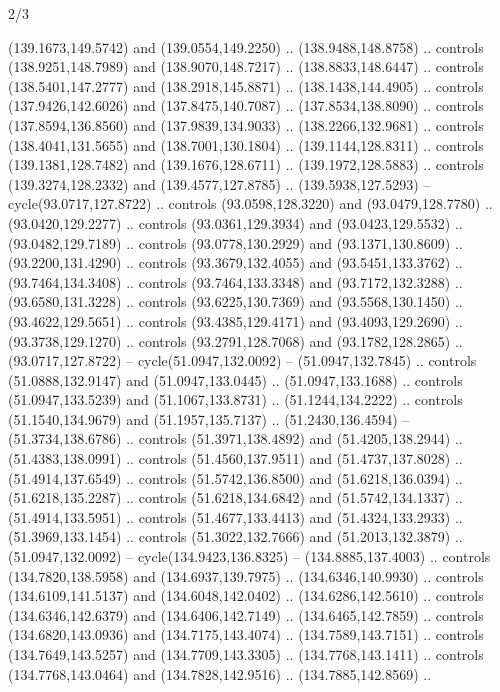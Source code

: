 \begin{flagdescription}{2/3}
\begin{scope}[shift={(0.5\flaglength,0.5)},scale=\flagwidth/320]
\begin{scope}[y=0.8pt, x=0.8pt, yscale=-1,shift={(-118.3,-146)}]
  (139.1673,149.5742) and (139.0554,149.2250) .. (138.9488,148.8758) .. controls
  (138.9251,148.7989) and (138.9070,148.7217) .. (138.8833,148.6447) .. controls
  (138.5401,147.2777) and (138.2918,145.8871) .. (138.1438,144.4905) .. controls
  (137.9426,142.6026) and (137.8475,140.7087) .. (137.8534,138.8090) .. controls
  (137.8594,136.8560) and (137.9839,134.9033) .. (138.2266,132.9681) .. controls
  (138.4041,131.5655) and (138.7001,130.1804) .. (139.1144,128.8311) .. controls
  (139.1381,128.7482) and (139.1676,128.6711) .. (139.1972,128.5883) .. controls
  (139.3274,128.2332) and (139.4577,127.8785) .. (139.5938,127.5293) --
  cycle(93.0717,127.8722) .. controls (93.0598,128.3220) and (93.0479,128.7780)
  .. (93.0420,129.2277) .. controls (93.0361,129.3934) and (93.0423,129.5532) ..
  (93.0482,129.7189) .. controls (93.0778,130.2929) and (93.1371,130.8609) ..
  (93.2200,131.4290) .. controls (93.3679,132.4055) and (93.5451,133.3762) ..
  (93.7464,134.3408) .. controls (93.7464,133.3348) and (93.7172,132.3288) ..
  (93.6580,131.3228) .. controls (93.6225,130.7369) and (93.5568,130.1450) ..
  (93.4622,129.5651) .. controls (93.4385,129.4171) and (93.4093,129.2690) ..
  (93.3738,129.1270) .. controls (93.2791,128.7068) and (93.1782,128.2865) ..
  (93.0717,127.8722) -- cycle(51.0947,132.0092) -- (51.0947,132.7845) ..
  controls (51.0888,132.9147) and (51.0947,133.0445) .. (51.0947,133.1688) ..
  controls (51.0947,133.5239) and (51.1067,133.8731) .. (51.1244,134.2222) ..
  controls (51.1540,134.9679) and (51.1957,135.7137) .. (51.2430,136.4594) --
  (51.3734,138.6786) .. controls (51.3971,138.4892) and (51.4205,138.2944) ..
  (51.4383,138.0991) .. controls (51.4560,137.9511) and (51.4737,137.8028) ..
  (51.4914,137.6549) .. controls (51.5742,136.8500) and (51.6218,136.0394) ..
  (51.6218,135.2287) .. controls (51.6218,134.6842) and (51.5742,134.1337) ..
  (51.4914,133.5951) .. controls (51.4677,133.4413) and (51.4324,133.2933) ..
  (51.3969,133.1454) .. controls (51.3022,132.7666) and (51.2013,132.3879) ..
  (51.0947,132.0092) -- cycle(134.9423,136.8325) -- (134.8885,137.4003) ..
  controls (134.7820,138.5958) and (134.6937,139.7975) .. (134.6346,140.9930) ..
  controls (134.6109,141.5137) and (134.6048,142.0402) .. (134.6286,142.5610) ..
  controls (134.6346,142.6379) and (134.6406,142.7149) .. (134.6465,142.7859) ..
  controls (134.6820,143.0936) and (134.7175,143.4074) .. (134.7589,143.7151) ..
  controls (134.7649,143.5257) and (134.7709,143.3305) .. (134.7768,143.1411) ..
  controls (134.7768,143.0464) and (134.7828,142.9516) .. (134.7885,142.8569) ..

\end{scope}
\end{scope}
\end{flagdescription}
